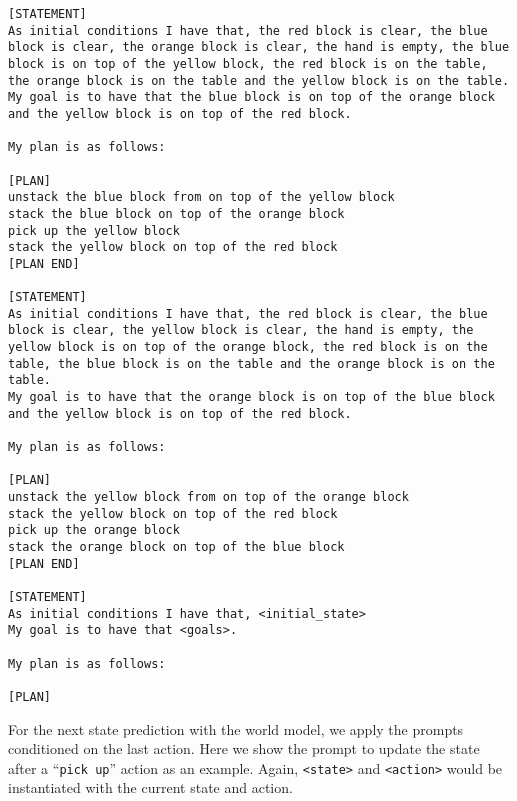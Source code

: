 \begin{lstlisting}[breaklines=true,breakatwhitespace=true]
[STATEMENT]
As initial conditions I have that, the red block is clear, the blue block is clear, the orange block is clear, the hand is empty, the blue block is on top of the yellow block, the red block is on the table, the orange block is on the table and the yellow block is on the table.
My goal is to have that the blue block is on top of the orange block and the yellow block is on top of the red block.

My plan is as follows:

[PLAN]
unstack the blue block from on top of the yellow block
stack the blue block on top of the orange block
pick up the yellow block
stack the yellow block on top of the red block
[PLAN END]

[STATEMENT]
As initial conditions I have that, the red block is clear, the blue block is clear, the yellow block is clear, the hand is empty, the yellow block is on top of the orange block, the red block is on the table, the blue block is on the table and the orange block is on the table.
My goal is to have that the orange block is on top of the blue block and the yellow block is on top of the red block.

My plan is as follows:

[PLAN]
unstack the yellow block from on top of the orange block
stack the yellow block on top of the red block
pick up the orange block
stack the orange block on top of the blue block
[PLAN END]

[STATEMENT]
As initial conditions I have that, <initial_state>
My goal is to have that <goals>.

My plan is as follows:

[PLAN]
\end{lstlisting}

For the next state prediction with the world model, we apply the prompts conditioned on the last action. Here we show the prompt to update the state after a ``\texttt{pick up}'' action as an example. Again, \texttt{<state>} and \texttt{<action>} would be instantiated with the current state and action.

